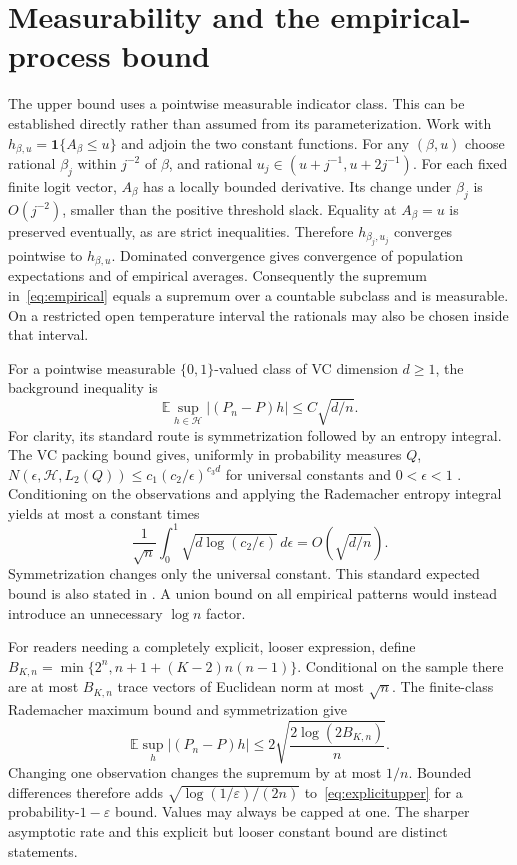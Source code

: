 \documentclass[10pt]{article}
\theoremstyle{definition}\newtheorem{definition}[theorem]{Definition}
\theoremstyle{remark}\newtheorem{remark}[theorem]{Remark}
\newcommand{\E}{\mathbb E}
\newcommand{\1}{\mathbf 1}
\newcommand{\HH}{\mathcal H}
\begin{document}
\section{Measurability and the empirical-process bound}\label{app:empirical}
The upper bound uses a pointwise measurable indicator class. This can be established directly rather than assumed from its parameterization. Work with $h_{\beta,u}=\1\{A_\beta\le u\}$ and adjoin the two constant functions. For any $(\beta,u)$ choose rational $\beta_j$ within $j^{-2}$ of $\beta$, and rational $u_j\in(u+j^{-1},u+2j^{-1})$. For each fixed finite logit vector, $A_\beta$ has a locally bounded derivative. Its change under $\beta_j$ is $O(j^{-2})$, smaller than the positive threshold slack. Equality at $A_\beta=u$ is preserved eventually, as are strict inequalities. Therefore $h_{\beta_j,u_j}$ converges pointwise to $h_{\beta,u}$. Dominated convergence gives convergence of population expectations and of empirical averages. Consequently the supremum in~\eqref{eq:empirical} equals a supremum over a countable subclass and is measurable. On a restricted open temperature interval the rationals may also be chosen inside that interval.

For a pointwise measurable $\{0,1\}$-valued class of VC dimension $d\ge1$, the background inequality is
\begin{equation}\label{eq:vcbackground}
 \E\sup_{h\in\HH}|(P_n-P)h|\le C\sqrt{d/n}.
\end{equation}
For clarity, its standard route is symmetrization followed by an entropy integral. The VC packing bound gives, uniformly in probability measures $Q$,
$N(\epsilon,\HH,L_2(Q))\le c_1(c_2/\epsilon)^{c_3d}$ for universal constants and $0<\epsilon<1$ \citep{haussler1995}. Conditioning on the observations and applying the Rademacher entropy integral yields at most a constant times
\[
 \frac1{\sqrt n}\int_0^1\sqrt{d\log(c_2/\epsilon)}\,d\epsilon
 =O(\sqrt{d/n}).
\]
Symmetrization changes only the universal constant. This standard expected bound is also stated in \citet[Lemma D.6]{zeng2025}. A union bound on all empirical patterns would instead introduce an unnecessary $\log n$ factor.

For readers needing a completely explicit, looser expression, define
$B_{K,n}=\min\{2^n,n+1+(K-2)n(n-1)\}$. Conditional on the sample there are at most $B_{K,n}$ trace vectors of Euclidean norm at most $\sqrt n$. The finite-class Rademacher maximum bound and symmetrization give
\begin{equation}\label{eq:explicitupper}
 \E\sup_h|(P_n-P)h|\le 2\sqrt{\frac{2\log(2B_{K,n})}{n}}.
\end{equation}
Changing one observation changes the supremum by at most $1/n$. Bounded differences therefore adds $\sqrt{\log(1/\varepsilon)/(2n)}$ to~\eqref{eq:explicitupper} for a probability-$1-\varepsilon$ bound. Values may always be capped at one. The sharper asymptotic rate and this explicit but looser constant bound are distinct statements.
\end{document}
